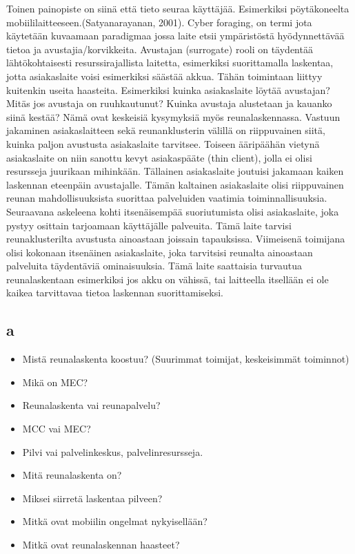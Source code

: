 \documentclass[finnish]{tktltiki2}
\theoremstyle{definition}
\theoremstyle{remark}
\begin{document}
Toinen painopiste on siinä että tieto seuraa käyttäjää. Esimerkiksi pöytäkoneelta mobiililaitteeseen.(Satyanarayanan, 2001).
Cyber foraging, on termi jota käytetään kuvaamaan paradigmaa jossa laite etsii ympäristöstä hyödynnettävää tietoa ja avustajia/korvikkeita. Avustajan (surrogate) rooli on täydentää lähtökohtaisesti resurssirajallista laitetta, esimerkiksi suorittamalla laskentaa, jotta asiakaslaite voisi esimerkiksi säästää akkua.
Tähän toimintaan liittyy kuitenkin useita haasteita. Esimerkiksi kuinka asiakaslaite löytää avustajan? Mitäs jos avustaja on ruuhkautunut? Kuinka avustaja alustetaan ja kauanko siinä kestää? 
Nämä ovat keskeisiä kysymyksiä myös reunalaskennassa. 
Vastuun jakaminen asiakaslaitteen sekä reunanklusterin välillä on riippuvainen siitä, kuinka paljon avustusta asiakaslaite tarvitsee. 
Toiseen ääripäähän vietynä asiakaslaite on niin sanottu kevyt asiakaspääte (thin client), jolla ei olisi resursseja juurikaan mihinkään. Tällainen asiakaslaite joutuisi jakamaan kaiken laskennan eteenpäin avustajalle. 
Tämän kaltainen asiakaslaite olisi riippuvainen reunan mahdollisuuksista suorittaa palveluiden vaatimia toiminnallisuuksia. 
Seuraavana askeleena kohti itsenäisempää suoriutumista olisi asiakaslaite, joka pystyy osittain tarjoamaan käyttäjälle palveuita. Tämä laite tarvisi reunaklusterilta avustusta ainoastaan joissain tapauksissa. 
Viimeisenä toimijana olisi kokonaan itsenäinen asiakaslaite, joka tarvitsisi reunalta ainoastaan palveluita täydentäviä ominaisuuksia.
Tämä laite saattaisia turvautua reunalaskentaan esimerkiksi jos akku on vähissä, tai laitteella itsellään ei ole kaikea tarvittavaa tietoa laskennan suorittamiseksi.

\subsection{a}
\begin{itemize}
\item Mistä reunalaskenta koostuu? (Suurimmat toimijat, keskeisimmät toiminnot)
\item Mikä on MEC?
\item Reunalaskenta vai reunapalvelu?
\item MCC vai MEC?
\item Pilvi vai palvelinkeskus, palvelinresursseja.
\item Mitä reunalaskenta on?
\item Miksei siirretä laskentaa pilveen?
\item Mitkä ovat mobiilin ongelmat nykyisellään?
\item Mitkä ovat reunalaskennan haasteet?
\end{itemize}
\end{document}
